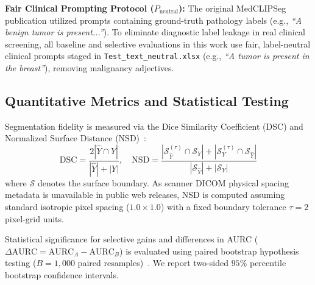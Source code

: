 \documentclass[10pt,journal,compsoc]{IEEEtran}
\begin{document}
\textbf{Fair Clinical Prompting Protocol ($P_{\mathrm{neutral}}$):} The original MedCLIPSeg publication utilized prompts containing ground-truth pathology labels (e.g., \emph{``A benign tumor is present...''}). To eliminate diagnostic label leakage in real clinical screening, all baseline and selective evaluations in this work use fair, label-neutral clinical prompts staged in \texttt{Test\_text\_neutral.xlsx} (e.g., \emph{``A tumor is present in the breast''}), removing malignancy adjectives.

\subsection{Quantitative Metrics and Statistical Testing}
Segmentation fidelity is measured via the Dice Similarity Coefficient (DSC) and Normalized Surface Distance (NSD)~\cite{nikolov2018deep}:
\begin{equation}
\mathrm{DSC} = \frac{2 |\hat{Y} \cap Y|}{|\hat{Y}| + |Y|}, \quad \mathrm{NSD} = \frac{|\mathcal{S}_{\hat{Y}}^{(\tau)} \cap \mathcal{S}_Y| + |\mathcal{S}_Y^{(\tau)} \cap \mathcal{S}_{\hat{Y}}|}{|\mathcal{S}_{\hat{Y}}| + |\mathcal{S}_Y|}
\end{equation}
where $\mathcal{S}$ denotes the surface boundary. As scanner DICOM physical spacing metadata is unavailable in public web releases, NSD is computed assuming standard isotropic pixel spacing ($1.0 \times 1.0$) with a fixed boundary tolerance $\tau = 2$ pixel-grid units.

Statistical significance for selective gains and differences in AURC ($\Delta\mathrm{AURC} = \mathrm{AURC}_A - \mathrm{AURC}_B$) is evaluated using paired bootstrap hypothesis testing ($B=1,000$ paired resamples)~\cite{efron1993introduction}. We report two-sided $95\%$ percentile bootstrap confidence intervals.
\end{document}
